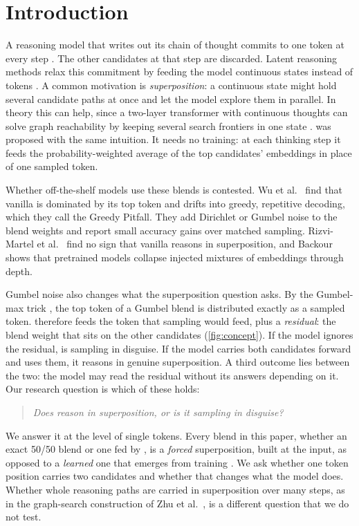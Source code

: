 \section{Introduction}\label{sec:intro}

A reasoning model that writes out its chain of thought commits to one token at every step \cite{wei2022chain}.
The other candidates at that step are discarded.
Latent reasoning methods relax this commitment by feeding the model continuous states instead of tokens
\cite{hao2024coconut,zhang2025soft}.
A common motivation is \emph{superposition}: a continuous state might hold several candidate paths at once and let
the model explore them in parallel.
In theory this can help, since a two-layer transformer with continuous thoughts can solve graph reachability by
keeping several search frontiers in one state \cite{zhu2025superposition}.
\ST{} \cite{zhang2025soft} was proposed with the same intuition.
It needs no training: at each thinking step it feeds the probability-weighted average of the top candidates'
embeddings in place of one sampled token.

Whether off-the-shelf models use these blends is contested.
Wu et al.~\cite{wu2025single} find that vanilla \ST{} is dominated by its top token and drifts into greedy, repetitive
decoding, which they call the Greedy Pitfall.
They add Dirichlet or Gumbel noise to the blend weights and report small accuracy gains over matched sampling.
Rizvi-Martel et al.~\cite{rizvimartel2026illusion} find no sign that vanilla \ST{} reasons in superposition,
and Backour~\cite{backour2026dynamics} shows that pretrained models collapse injected mixtures of embeddings through depth.

Gumbel noise also changes what the superposition question asks.
By the Gumbel-max trick \cite{gumbel1954statistical,maddison2014sampling}, the top token of a Gumbel blend is
distributed exactly as a sampled token.
\GST{} therefore feeds the token that sampling would feed, plus a \emph{residual}: the blend weight that sits on the
other candidates (\cref{fig:concept}).
If the model ignores the residual, \GST{} is sampling in disguise.
If the model carries both candidates forward and uses them, it reasons in genuine superposition.
A third outcome lies between the two: the model may read the residual without its answers depending on it.
Our research question is which of these holds:
\begin{quote}
\emph{Does \GST{} reason in superposition, or is it sampling in disguise?}
\end{quote}
We answer it at the level of single tokens.
Every blend in this paper, whether an exact 50/50 blend or one fed by \GST{}, is a \emph{forced} superposition,
built at the input, as opposed to a \emph{learned} one that emerges from training \cite{rizvimartel2026illusion}.
We ask whether one token position carries two candidates and whether that changes what the model does.
Whether whole reasoning paths are carried in superposition over many steps, as in the graph-search construction of
Zhu et al.~\cite{zhu2025superposition}, is a different question that we do not test.

